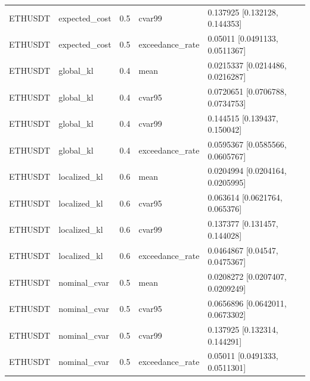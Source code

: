 \begin{table}[!htbp]
\begin{tabular}{llrll}
ETHUSDT & expected\_cost & 0.5 & cvar99 & 0.137925 [0.132128, 0.144353] \\
ETHUSDT & expected\_cost & 0.5 & exceedance\_rate & 0.05011 [0.0491133, 0.0511367] \\
ETHUSDT & global\_kl & 0.4 & mean & 0.0215337 [0.0214486, 0.0216287] \\
ETHUSDT & global\_kl & 0.4 & cvar95 & 0.0720651 [0.0706788, 0.0734753] \\
ETHUSDT & global\_kl & 0.4 & cvar99 & 0.144515 [0.139437, 0.150042] \\
ETHUSDT & global\_kl & 0.4 & exceedance\_rate & 0.0595367 [0.0585566, 0.0605767] \\
ETHUSDT & localized\_kl & 0.6 & mean & 0.0204994 [0.0204164, 0.0205995] \\
ETHUSDT & localized\_kl & 0.6 & cvar95 & 0.063614 [0.0621764, 0.065376] \\
ETHUSDT & localized\_kl & 0.6 & cvar99 & 0.137377 [0.131457, 0.144028] \\
ETHUSDT & localized\_kl & 0.6 & exceedance\_rate & 0.0464867 [0.04547, 0.0475367] \\
ETHUSDT & nominal\_cvar & 0.5 & mean & 0.0208272 [0.0207407, 0.0209249] \\
ETHUSDT & nominal\_cvar & 0.5 & cvar95 & 0.0656896 [0.0642011, 0.0673302] \\
ETHUSDT & nominal\_cvar & 0.5 & cvar99 & 0.137925 [0.132314, 0.144291] \\
ETHUSDT & nominal\_cvar & 0.5 & exceedance\_rate & 0.05011 [0.0491333, 0.0511301] \\
\bottomrule
\end{tabular}
\end{table}
